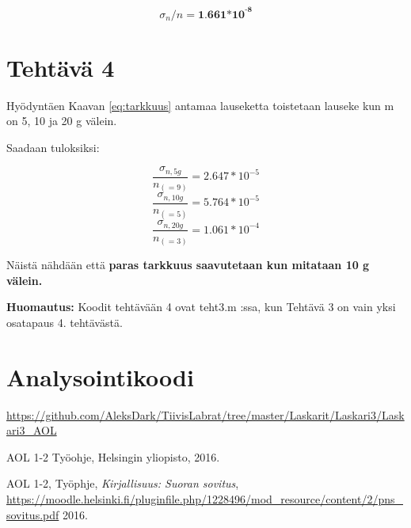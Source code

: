 \documentclass[a4paper, 12pt]{article}
\begin{document}
\begin{equation}
\sigma_n /n = \textbf{1.661*10}^{\textbf{-8}}
\label{eq:tarkkuus}
\end{equation}

\section*{Tehtävä 4}

Hyödyntäen Kaavan \ref{eq:tarkkuus} antamaa lauseketta toistetaan lauseke kun m on 5, 10 ja 20 g välein.

Saadaan tuloksiksi:

\begin{equation}
\frac{\sigma_{n,5g}}{ n_{(=9)}}  = 2.647* 10^{-5}
\end{equation}
\begin{equation}
\frac{\sigma_{n,10g}}{ n_{(=5)}}  = 5.764* 10^{-5}
\end{equation}
\begin{equation}
\frac{\sigma_{n,20g}}{ n_{(=3)}}  = 1.061* 10^{-4}
% 
% 
% 
% 
% 
% 
% 
% 
% 
% 
% 
% 
% 
% 
% 
% 
\end{equation}

Näistä nähdään että \textbf{paras tarkkuus saavutetaan kun mitataan 10 g välein.}

\textbf{Huomautus:} Koodit tehtävään 4 ovat teht3.m :ssa, kun Tehtävä 3 on vain yksi osatapaus 4. tehtävästä. 

\section*{Analysointikoodi}
\url{https://github.com/AleksDark/TiivisLabrat/tree/master/Laskarit/Laskari3/Laskari3_AOL}

\begin{thebibliography}{1}

  AOL 1-2 Työohje,
  Helsingin yliopisto,
  2016.

  AOL 1-2, Työphje,
  \emph{Kirjallisuus: Suoran sovitus},
  \url{https://moodle.helsinki.fi/pluginfile.php/1228496/mod_resource/content/2/pns_sovitus.pdf}
  2016.



\end{thebibliography}
\end{document}

